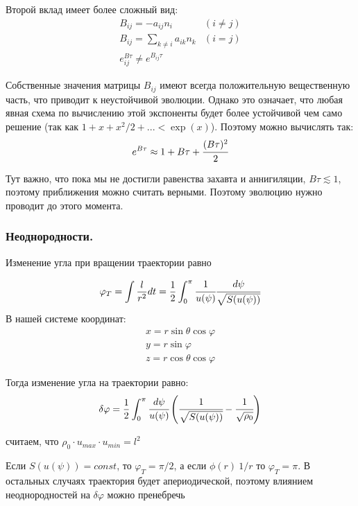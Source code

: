 Второй вклад имеет более сложный вид:
\begin{eqnarray*}
	B_{ij} = -a_{ij} n_i & ( i \ne j)\\
	B_{ij} = \sum_{k \neq i}{a_{ik} n_k} & (i = j)  \\
	e^{B \tau}_{ij} \ne e^{B_{ij} \tau}
\end{eqnarray*}

Собственные значения матрицы $B_{ij}$ имеют всегда положительную вещественную часть, что приводит к неустойчивой эволюции. Однако это означает, что любая явная схема по вычислению этой экспоненты будет более устойчивой чем само решение (так как $1+x+x^2/2+... < \exp(x)$). Поэтому можно вычислять так:
\begin{eqnarray*}
	e^{B \tau} \approx 1 + B \tau + \cfrac{(B \tau)^2}{2}
\end{eqnarray*}

Тут важно, что пока мы не достигли равенства захавта и аннигиляции, $B \tau \lesssim 1$, поэтому приближения можно считать верными. Поэтому эволюцию нужно проводит до этого момента.


\subsubsection{Неоднородности.}

Изменение угла при вращении траектории равно

\begin{equation*}
	\varphi_{T} = \int {\frac{l}{r^2} dt} =  \frac{1}{2}\int_{0}^{\pi} {
		\cfrac{1}{u(\psi)} \cfrac{d\psi}{\sqrt{S(u(\psi))}}}
\end{equation*}
В нашей системе координат: 
\begin{eqnarray*}
	x = r \sin{\theta} \cos{\varphi}
	\\
	y = r \sin{\varphi}
	\\
	z = r \cos{\theta} \cos{\varphi}
\end{eqnarray*}

Тогда изменение угла на траектории равно:
\begin{equation*}
\delta \varphi  =  \frac{1}{2}\int_{0}^{\pi} {
	\cfrac{d\psi}{u(\psi)} \left(\cfrac{1}{\sqrt{S(u(\psi))}} -\cfrac{1}{\sqrt{\rho_0}}   \right)}
\end{equation*}

считаем, что $\rho_0 \cdot u_{max}\cdot u_{min} = l^2$

Если $S(u(\psi)) = const$, то $\varphi_{T} = \pi/2$, а если $\phi(r) ~ 1/r$ то  $\varphi_{T} = \pi$. В остальных случаях траектория будет апериодической, поэтому  влиянием неоднородностей на $\delta \varphi$ можно пренебречь

